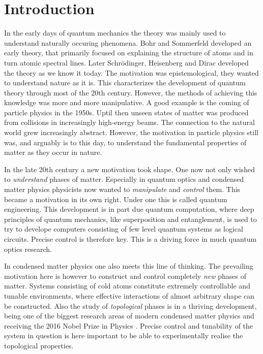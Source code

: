 
\chapter{Introduction} %

\label{Chapter1} %


In the early days of quantum mechanics the theory was mainly used to understand naturally occuring phenomena. Bohr and Sommerfeld developed an early theory, that primarily focused on explaining the structure of atoms and in turn atomic spectral lines. Later Schr{\"o}dinger, Heisenberg and Dirac developed the theory as we know it today. The motivation was epistemological, they wanted to understand nature as it is. This characterizes the development of quantum theory through most of the 20th century. However, the methods of achieving this knowledge was more and more manipulative. A good example is the coming of particle physics in the 1950s. Uptil then unseen states of matter was produced from collisions in increasingly high-energy beams. The connection to the natural world grew increasingly abstract. However, the motivation in particle physics still was, and arguably is to this day, to understand the fundamental properties of matter as they occur in nature. 

In the late 20th century a new motivation took shape. One now not only wished to \textit{understand} phases of matter. Especially in quantum optics and condensed matter physics physicists now wanted to \textit{manipulate} and \textit{control} them. This became a motivation in its own right. Under one this is called quantum engineering. This development is in part due quantum computation, where deep principles of quantum mechanics, like superposition and entanglement, is used to try to develope computers consisting of few level quantum systems as logical circuits. Precise control is therefore key. This is a driving force in much quantum optics research. 

In condensed matter physics one also meets this line of thinking. The prevailing motivation here is however to construct and control completely \textit{new} phases of matter. Systems consisting of cold atoms constitute extremely controllable and tunable environments, where effective interactions of almost arbitrary shape can be constructed. Also the study of \textit{topological} phases is in a thriving development, being one of the biggest research areas of modern condensed matter physics and receiving the 2016 Nobel Prize in Physics \cite{NobelPrize2016}. Precise control and tunability of the system in question is here important to be able to experimentally realise the topological properties. 


